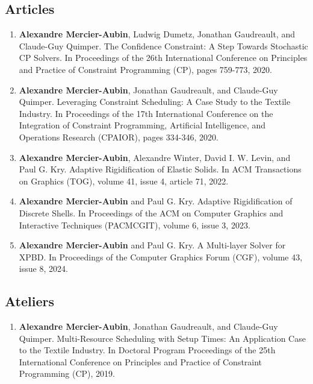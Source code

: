 \documentclass[10pt]{article} %
\begin{document}
\subsection{Articles}
%
%
\begin{enumerate}
  \setcounter{enumi}{\value{listCounter}}
  \item \textbf{Alexandre Mercier-Aubin}, Ludwig Dumetz, Jonathan Gaudreault, and Claude-Guy Quimper. The Confidence Constraint: A Step Towards Stochastic CP Solvers. In Proceedings of the 26th International Conference on Principles and Practice of Constraint Programming (CP), pages 759-773, 2020. 

 \item \textbf{Alexandre Mercier-Aubin}, Jonathan Gaudreault, and Claude-Guy Quimper. Leveraging Constraint Scheduling: A Case Study to the Textile Industry. In Proceedings of the 17th International Conference on the Integration of Constraint Programming, Artificial Intelligence, and Operations Research (CPAIOR), pages 334-346, 2020. 

 \item \textbf{Alexandre Mercier-Aubin},  Alexandre Winter,  David I. W. Levin, and Paul G. Kry. Adaptive Rigidification of Elastic Solids. In ACM Transactions on Graphics (TOG), volume 41, issue 4, article 71, 2022.  

 \item \textbf{Alexandre Mercier-Aubin} and Paul G. Kry. Adaptive Rigidification of Discrete Shells. In Proceedings of the ACM on Computer Graphics and Interactive Techniques (PACMCGIT), volume 6, issue 3, 2023. 

\item \textbf{Alexandre Mercier-Aubin} and Paul G. Kry. A Multi-layer Solver for XPBD. In Proceedings of the Computer Graphics Forum (CGF), volume 43, issue 8, 2024. 
\end{enumerate}



\subsection{Ateliers}
\begin{enumerate}
  \setcounter{enumi}{\value{listCounter}}
  \item \textbf{Alexandre Mercier-Aubin}, Jonathan Gaudreault, and Claude-Guy Quimper. Multi-Resource Scheduling with Setup Times:
An Application Case to the Textile Industry. In  Doctoral Program Proceedings of the 25th International
Conference on Principles and Practice of Constraint Programming (CP), 2019. 

\end{enumerate}
\end{document}

